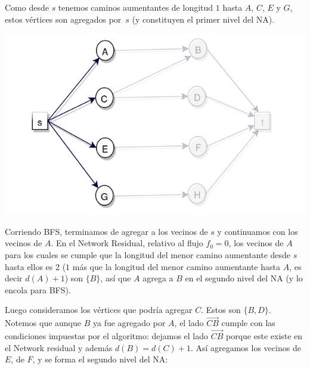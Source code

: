 \documentclass[10pt,a4paper]{article}
\begin{document}
Como desde $s$ tenemos caminos aumentantes de longitud $1$ hasta $A$, $C$, $E$ y $G$, estos vértices son agregados por $s$ (y constituyen el primer nivel del NA).

\begin{center}

    \begin{adjustbox}{max size={\textwidth}{\textheight}}
        \includegraphics{definitions/D2.jpg}
        \end{adjustbox}
    
\end{center}

Corriendo BFS, terminamos de agregar a los vecinos de $s$ y continuamos con los vecinos de $A$. En el Network Residual, relativo al flujo $f_0 = 0$, los vecinos de $A$ para los cuales se cumple que la longitud del menor camino aumentante desde $s$ hasta ellos es $2$ ($1$ más que la longitud del menor camino aumentante hasta $A$, es decir $d(A) + 1$) son $\{B\}$, así que $A$ agrega a $B$ en el segundo nivel del NA (y lo encola para BFS).

Luego consideramos los vértices que podría agregar $C$. Estos son $\{B, D\}$. Notemos que aunque $B$ ya fue agregado por $A$, el lado $\overrightarrow{CB}$ cumple con las condiciones impuestas por el algoritmo: dejamos el lado $\overrightarrow{CB}$ porque este existe en el Network residual y además $d(B) = d(C) + 1$. Así agregamos los vecinos de $E$, de $F$, y se forma el segundo nivel del NA:
\end{document}
